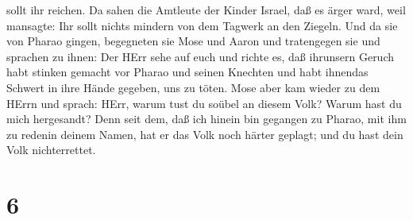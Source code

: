 sollt ihr reichen.  Da sahen die Amtleute der Kinder
Israel, daß es ärger ward, weil mansagte: Ihr sollt nichts mindern von
dem Tagwerk an den Ziegeln.  Und da sie von Pharao gingen,
begegneten sie Mose und Aaron und tratengegen sie  und
sprachen zu ihnen: Der HErr sehe auf euch und richte es, daß ihrunsern
Geruch habt stinken gemacht vor Pharao und seinen Knechten und habt
ihnendas Schwert in ihre Hände gegeben, uns zu töten.  Mose
aber kam wieder zu dem HErrn und sprach: HErr, warum tust du soübel an
diesem Volk? Warum hast du mich hergesandt?  Denn seit dem,
daß ich hinein bin gegangen zu Pharao, mit ihm zu redenin deinem Namen,
hat er das Volk noch härter geplagt; und du hast dein Volk
nichterrettet.

\hypertarget{section-5}{%
\section{6}\label{section-5}}

